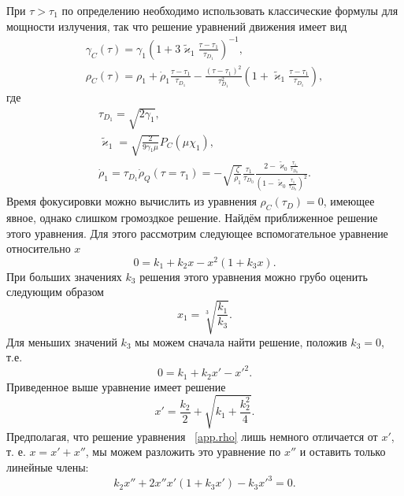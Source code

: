 При $\tau > \tau_1$ по определению необходимо использовать классические формулы для мощности излучения, так что решение уравнений движения имеет вид
\begin{gather}
    \label{eq:ch3/gamma_C}
    \gamma_C(\tau) = \gamma_1 \left(1+ 3\tilde\varkappa_1\frac{\tau - \tau_1}{\tau_{D_1}} \right)^{-1} ,\\
    \label{eq:ch3/rho_C}
    \rho_C(\tau) = \rho_1 + \dot{\rho}_1 \frac{\tau - \tau_1}{\tau_{D_1}} - \frac{(\tau-\tau_1)^2}{\tau_{D_1}^2}\left(1+\tilde\varkappa_1\frac{\tau - \tau_1 }{\tau_{D_1}}\right), 
\end{gather}
где
\begin{gather}
    \tau_{D_1}  = \sqrt{2 \gamma_1}, \\
    \tilde\varkappa_1 = \sqrt{\frac{2}{9\gamma_1\mu}}P_C(\mu\chi_1) , \\
    \dot{\rho}_1 = \tau_{D_1} \dot{\rho}_Q (\tau = \tau_1) = - \sqrt{\frac{\zeta}{\rho_1}}\frac{\tau_1 }{\tau_{D_0}}\frac{2-\tilde\varkappa_0 \frac{\tau_1}{\tau_{D_0}}}{\left( 1 - \tilde\varkappa_0 \frac{\tau_1}{\tau_{D_0}} \right)^2}. 
\end{gather}
Время фокусировки можно вычислить из уравнения $\rho_C(\tau_D) = 0$, имеющее явное, однако слишком громоздкое решение.
Найдём приближенное решение этого уравнения.
Для этого рассмотрим следующее вспомогательное уравнение относительно $x$
\begin{equation}
    \label{app.rho}
    0 = k_1 + k_2 x - x^2 \left( 1 + k_3 x \right).
\end{equation}
При больших значениях $k_3$ решения этого уравнения можно грубо оценить следующим образом
\begin{equation}
    x_1 = \sqrt[3]{\frac{k_1}{k_3}}.
\end{equation}
Для меньших значений $k_3$ мы можем сначала найти решение, положив $k_3=0$, т.е.
\begin{equation}
    0 = k_1 + k_2 x' - x'^2.
\end{equation}
Приведенное выше уравнение имеет решение
\begin{equation}
    x' = \frac{k_2}{2} + \sqrt{k_1 + \frac{k_2^2}{4}} .
\end{equation}
Предполагая, что решение уравнения ~\eqref{app.rho} лишь немного отличается от $x'$, т. е. $x=x'+x''$, мы можем разложить это уравнение по $x''$ и оставить только линейные члены:
\begin{equation}
    k_2 x'' + 2 x'' x' (1 + k_3 x') - k_3 x'^3 = 0.
\end{equation}
